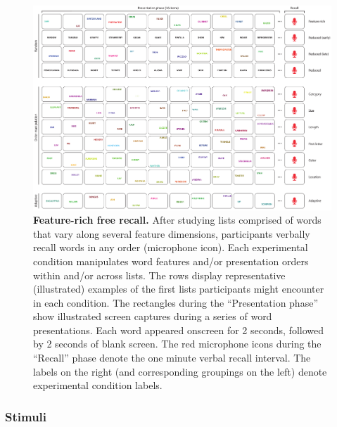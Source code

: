 \documentclass[11pt]{article}
\begin{document}
\begin{figure}[tp]
    \centering
        \includegraphics[width=\textwidth]{figures/FRFR}
        
\caption{\textbf{Feature-rich free recall.} After studying lists comprised of
words that vary along several feature dimensions, participants verbally recall
words in any order (microphone icon). Each experimental condition manipulates
word features and/or presentation orders within and/or across lists. The rows
display representative (illustrated) examples of the first lists participants
might encounter in each condition. The rectangles during the ``Presentation
phase'' show illustrated screen captures during a series of word presentations.
Each word appeared onscreen for 2 seconds, followed by 2 seconds of blank
screen. The red microphone icons during the ``Recall'' phase denote the one
minute verbal recall interval. The labels on the right (and corresponding
groupings on the left) denote experimental condition labels.}

    \label{fig:exp}
\end{figure}



\subsubsection*{Stimuli}
\end{document}
